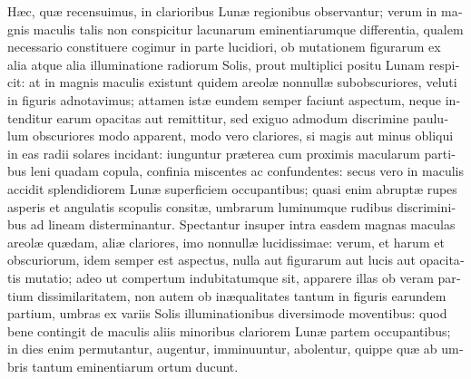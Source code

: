 \documentclass[11pt,twoside,openany]{book}
\begin{document}
\begin{otherlanguage}{latin}
Hæc, quæ recensuimus, in clarioribus Lunæ regionibus observantur; verum in magnis maculis talis non conspicitur lacunarum eminentiarumque differentia, qualem necessario constituere cogimur in parte lucidiori, ob mutationem figurarum ex alia atque alia illuminatione radiorum Solis, prout multiplici positu Lunam respicit: at in magnis maculis existunt quidem areolæ nonnullæ subobscuriores, veluti in figuris adnotavimus; attamen istæ eundem semper faciunt aspectum, neque intenditur earum opacitas aut remittitur, sed exiguo admodum discrimine paululum obscuriores modo apparent, modo vero clariores, si magis aut minus obliqui in eas radii solares incidant: iunguntur præterea cum proximis macularum partibus leni quadam copula, confinia miscentes ac confundentes: secus vero in maculis accidit splendidiorem Lunæ superficiem occupantibus; quasi enim abruptæ rupes asperis et angulatis scopulis consitæ, umbrarum luminumque rudibus discriminibus ad lineam disterminantur. Spectantur insuper intra easdem magnas maculas areolæ quædam, aliæ clariores, imo nonnullæ lucidissimae: verum, et harum et obscuriorum, idem semper est aspectus, nulla aut figurarum aut lucis aut opacitatis mutatio; adeo ut compertum indubitatumque sit, apparere illas ob veram partium dissimilaritatem, non autem ob inæqualitates tantum in figuris earundem partium, umbras ex variis Solis illuminationibus diversimode moventibus: quod bene contingit de maculis aliis minoribus clariorem Lunæ partem occupantibus; in dies enim permutantur, augentur, imminuuntur, abolentur, quippe quæ ab umbris tantum eminentiarum ortum ducunt.


\end{otherlanguage}
\end{document}
